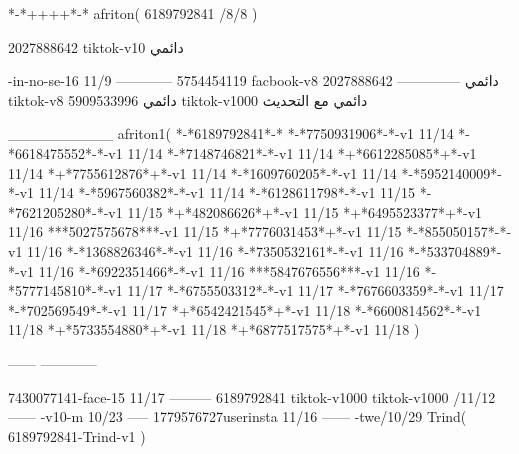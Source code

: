 *-*++++*-*
afriton(
6189792841 /8/8
)

2027888642 tiktok-v10
دائمي

-in-no-se-16 11/9
------------
5754454119 facbook-v8
دائمي
--------------
2027888642 tiktok-v8
دائمي
5909533996 tiktok-v1000
دائمي مع التحديث

__________
afriton1(
*-*6189792841*-*
*-*7750931906*-*-v1 11/14
*-*6618475552*-*-v1 11/14
*-*7148746821*-*-v1 11/14
*+*6612285085*+*-v1 11/14
*+*7755612876*+*-v1 11/14
*-*1609760205*-*-v1 11/14
*-*5952140009*-*-v1 11/14
*-*5967560382*-*-v1 11/14
*-*6128611798*-*-v1 11/15
*-*7621205280*-*-v1 11/15
*+*482086626*+*-v1 11/15
*+*6495523377*+*-v1 11/16
***5027575678***-v1 11/15
*+*7776031453*+*-v1 11/15
*-*855050157*-*-v1 11/16
*-*1368826346*-*-v1 11/16
*-*7350532161*-*-v1 11/16
*-*533704889*-*-v1 11/16
*-*6922351466*-*-v1 11/16
***5847676556***-v1 11/16
*-*5777145810*-*-v1 11/17
*-*6755503312*-*-v1 11/17
*-*7676603359*-*-v1 11/17
*-*702569549*-*-v1 11/17
*+*6542421545*+*-v1 11/18
*-*6600814562*-*-v1 11/18
*+*5733554880*+*-v1 11/18
*+*6877517575*+*-v1 11/18
)

------
------------

7430077141-face-15 11/17
---------
6189792841 tiktok-v1000
tiktok-v1000 /11/12
------
-v10-m 10/23
-----
1779576727userinsta 11/16
------
-twe/10/29
Trind(
6189792841-Trind-v1 
)
